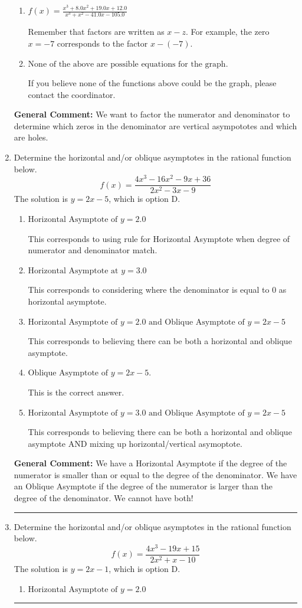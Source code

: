 \documentclass{extbook}[14pt]
\newcommand{\litem}[1]{\item #1

\rule{\textwidth}{0.4pt}}
\begin{document}
\begin{enumerate}
{\begin{enumerate}[label=\Alph*.]
This is the correct answer!
\item \( f(x)=\frac{x^{3} +8.0 x^{2} +19.0 x + 12.0}{x^{3} + x^{2} -41.0 x -105.0} \)

Remember that factors are written as $x-z$. For example, the zero $x=-7$ corresponds to the factor $x-(-7)$.
\item \( \text{None of the above are possible equations for the graph.} \)

If you believe none of the functions above could be the graph, please contact the coordinator.
\end{enumerate}

\textbf{General Comment:} We want to factor the numerator and denominator to determine which zeros in the denominator are vertical asympototes and which are holes.
}
\litem{
Determine the horizontal and/or oblique asymptotes in the rational function below.
\[ f(x) = \frac{4x^{3} -16 x^{2} -9 x + 36}{2x^{2} -3 x -9} \]The solution is \( y = 2x -5 \), which is option D.\begin{enumerate}[label=\Alph*.]
\item \( \text{Horizontal Asymptote of } y = 2.0  \)

This corresponds to using rule for Horizontal Asymptote when degree of numerator and denominator match.
\item \( \text{Horizontal Asymptote at } y = 3.0 \)

This corresponds to considering where the denominator is equal to 0 as horizontal asymptote.
\item \( \text{Horizontal Asymptote of } y = 2.0 \text{ and Oblique Asymptote of } y = 2x -5 \)

This corresponds to believing there can be both a horizontal and oblique asymptote.
\item \( \text{Oblique Asymptote of } y = 2x -5. \)

This is the correct answer.
\item \( \text{Horizontal Asymptote of } y = 3.0 \text{ and Oblique Asymptote of } y = 2x -5 \)

This corresponds to believing there can be both a horizontal and oblique asymptote AND mixing up horizontal/vertical asymoptote.
\end{enumerate}

\textbf{General Comment:} We have a Horizontal Asymptote if the degree of the numerator is smaller than or equal to the degree of the denominator. We have an Oblique Asymptote if the degree of the numerator is larger than the degree of the denominator. We cannot have both!
}
\litem{
Determine the horizontal and/or oblique asymptotes in the rational function below.
\[ f(x) = \frac{4x^{3} -19 x + 15}{2x^{2} +x -10} \]The solution is \( y = 2x -1 \), which is option D.\begin{enumerate}[label=\Alph*.]
\item \( \text{Horizontal Asymptote of } y = 2.0  \)


\end{enumerate}}
\end{enumerate}
\end{document}

